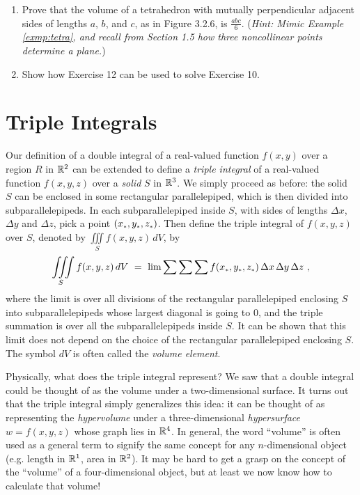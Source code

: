 \begin{enumerate}[\bfseries 1.]
{}
 \item Prove that the volume of a tetrahedron with mutually perpendicular adjacent sides of lengths $a$, $b$, and $c$,
  as in Figure 3.2.6, is $\frac{abc}{6}$. (\emph{Hint: Mimic Example \ref{exmp:tetra}, and recall from Section 1.5 how
  three noncollinear points determine a plane.})
 \item Show how Exercise 12 can be used to solve Exercise 10.
\end{enumerate}
\newpage
\section{Triple Integrals}
Our definition of a double integral of a real-valued function $f(x,y)$ over a region $R$ in $\mathbb{R}^{2}$ can be
extended to define a \emph{triple integral} of a real-valued function $f(x,y,z)$ over a \emph{solid} $S$ in
$\mathbb{R}^{3}$. We simply proceed as before: the solid $S$ can be enclosed in some rectangular parallelepiped, which is
then divided into subparallelepipeds. In each subparallelepiped inside $S$, with sides of lengths $\Delta x$,
$\Delta y$ and $\Delta z$, pick a point $(x_{\scriptscriptstyle *},y_{\scriptscriptstyle *},z_{\scriptscriptstyle *})$. 
Then define the triple
integral of $f(x,y,z)$ over $S$, denoted by $\iiint\limits_{S} f(x,y,z)\,dV$, by\index{$\iiint$}
\begin{equation}
 \iiint\limits_{S} f(x,y,z)\,dV ~=~
  \lim \sum \sum \sum f(x_{\scriptscriptstyle *},y_{\scriptscriptstyle *},z_{\scriptscriptstyle *})\,\Delta x\,\Delta y\,\Delta z ~,
\end{equation}
where the limit is over all divisions of the rectangular parallelepiped enclosing $S$ into subparallelepipeds whose
largest diagonal is going to $0$, and the triple summation is over all the subparallelepipeds inside $S$. It can be
shown that this limit does not depend on the choice of the rectangular parallelepiped enclosing $S$. The symbol $dV$
is often called the \emph{volume element}.

Physically,
what does the triple integral represent? We saw that a double integral could be thought of as the volume under a
two-dimensional surface. It turns out that the triple integral simply generalizes this idea: it can be thought of as
representing the \emph{hypervolume} under a three-dimensional \emph{hypersurface} $w=f(x,y,z)$ whose graph lies in
$\mathbb{R}^{4}$. In general, the word ``volume'' is
often used as a general term to signify the same concept for any $n$-dimensional object (e.g. length in $\mathbb{R}^{1}$,
area in $\mathbb{R}^{2}$). It may be hard to get a grasp on the
concept of the ``volume'' of a four-dimensional object, but at least we now know how to calculate that volume!

